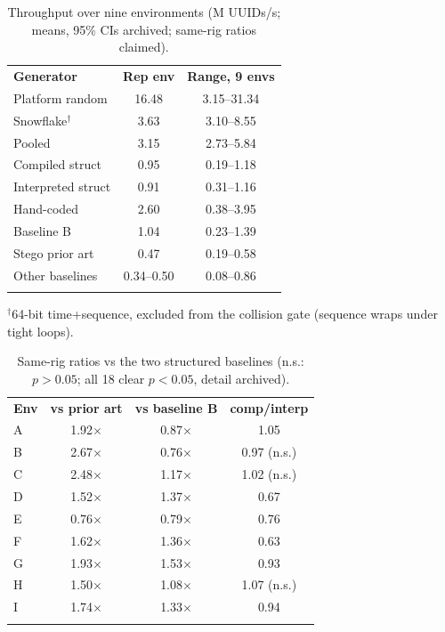 \documentclass{svproc}
\begin{document}
\begin{table}[t]
\caption{Throughput over nine environments (M UUIDs/s; means, 95\% CIs archived; same-rig ratios claimed).}
\label{tab:throughput}
\centering\scriptsize\setlength{\tabcolsep}{3pt}
\begin{tabular}{lcc}
\hline\noalign{\smallskip}
\textbf{Generator} & \textbf{Rep env} & \textbf{Range, 9 envs} \\
\noalign{\smallskip}\hline\noalign{\smallskip}
Platform random   & 16.48 & 3.15--31.34 \\
Snowflake$^\dagger$ & 3.63 & 3.10--8.55 \\
Pooled            & 3.15 & 2.73--5.84 \\
Compiled struct   & 0.95 & 0.19--1.18 \\
Interpreted struct & 0.91 & 0.31--1.16 \\
Hand-coded        & 2.60 & 0.38--3.95 \\
Baseline B        & 1.04 & 0.23--1.39 \\
Stego prior art   & 0.47 & 0.19--0.58 \\
Other baselines   & 0.34--0.50 & 0.08--0.86 \\
\noalign{\smallskip}\hline
\end{tabular}
\smallskip
\scriptsize $^\dagger$64-bit time+sequence, excluded from the collision gate (sequence wraps under tight loops).
\end{table}

\begin{table}[t]
\caption{Same-rig ratios vs the two structured baselines (n.s.: $p>0.05$; all 18 clear $p<0.05$, detail archived).}
\label{tab:paired}
\centering\scriptsize\setlength{\tabcolsep}{3pt}
\begin{tabular}{lccc}
\hline\noalign{\smallskip}
\textbf{Env} & \textbf{vs prior art} & \textbf{vs baseline B} & \textbf{comp/interp} \\
\noalign{\smallskip}\hline\noalign{\smallskip}
A & 1.92$\times$ & 0.87$\times$ & 1.05 \\
B & 2.67$\times$ & 0.76$\times$ & 0.97 (n.s.) \\
C & 2.48$\times$ & 1.17$\times$ & 1.02 (n.s.) \\
D & 1.52$\times$ & 1.37$\times$ & 0.67 \\
E & 0.76$\times$ & 0.79$\times$ & 0.76 \\
F & 1.62$\times$ & 1.36$\times$ & 0.63 \\
G & 1.93$\times$ & 1.53$\times$ & 0.93 \\
H & 1.50$\times$ & 1.08$\times$ & 1.07 (n.s.) \\
I & 1.74$\times$ & 1.33$\times$ & 0.94 \\
\noalign{\smallskip}\hline
\end{tabular}
\end{table}
\end{document}
